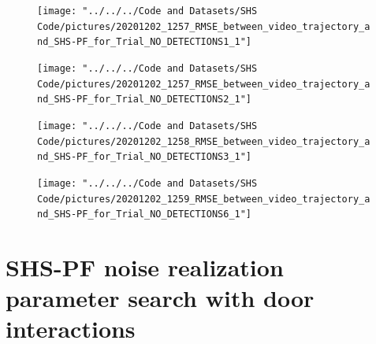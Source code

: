 \begin{figure}[H]
	\centering
	\texttt{[image: "../../../Code and Datasets/SHS Code/pictures/20201202\_1257\_RMSE\_between\_video\_trajectory\_and\_SHS-PF\_for\_Trial\_NO\_DETECTIONS1\_1"]}
	\setlength{\belowcaptionskip}{-20pt}
	\caption{}
	\label{fig:202012021257rmsebetweenvideotrajectoryandshs-pffortrialnodetections11}
\end{figure}
\begin{figure}[H]
	\centering
	\texttt{[image: "../../../Code and Datasets/SHS Code/pictures/20201202\_1257\_RMSE\_between\_video\_trajectory\_and\_SHS-PF\_for\_Trial\_NO\_DETECTIONS2\_1"]}
	\setlength{\belowcaptionskip}{-20pt}
	\caption{}
	\label{fig:202012021257rmsebetweenvideotrajectoryandshs-pffortrialnodetections21}
\end{figure}
\begin{figure}[H]
	\centering
	\texttt{[image: "../../../Code and Datasets/SHS Code/pictures/20201202\_1258\_RMSE\_between\_video\_trajectory\_and\_SHS-PF\_for\_Trial\_NO\_DETECTIONS3\_1"]}
	\setlength{\belowcaptionskip}{-20pt}
	\caption{}
	\label{fig:202012021258rmsebetweenvideotrajectoryandshs-pffortrialnodetections31}
\end{figure}
\begin{figure}[H]
	\centering
	\texttt{[image: "../../../Code and Datasets/SHS Code/pictures/20201202\_1259\_RMSE\_between\_video\_trajectory\_and\_SHS-PF\_for\_Trial\_NO\_DETECTIONS6\_1"]}
	\setlength{\belowcaptionskip}{-20pt}
	\caption{}
	\label{fig:202012021259rmsebetweenvideotrajectoryandshs-pffortrialnodetections61}
\end{figure}



\section{SHS-PF noise realization parameter search \textbf{with} door interactions}
\label{sec:app-shs_pf_noise_realization}


